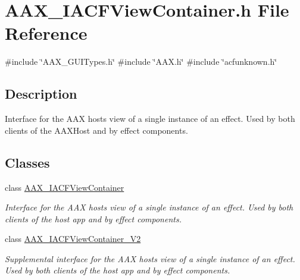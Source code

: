 \hypertarget{a00560}{}\section{A\+A\+X\+\_\+\+I\+A\+C\+F\+View\+Container.\+h File Reference}
\label{a00560}
{\ttfamily \#include \char`\"{}A\+A\+X\+\_\+\+G\+U\+I\+Types.\+h\char`\"{}}\newline
{\ttfamily \#include \char`\"{}A\+A\+X.\+h\char`\"{}}\newline
{\ttfamily \#include \char`\"{}acfunknown.\+h\char`\"{}}\newline


\subsection{Description}
Interface for the A\+AX host\textquotesingle{}s view of a single instance of an effect. Used by both clients of the A\+A\+X\+Host and by effect components. 

\subsection*{Classes}
\begin{DoxyCompactItemize}
\item 
class \mbox{\hyperlink{a01765}{A\+A\+X\+\_\+\+I\+A\+C\+F\+View\+Container}}
\begin{DoxyCompactList}\small\item\em Interface for the A\+AX host\textquotesingle{}s view of a single instance of an effect. Used by both clients of the host app and by effect components. \end{DoxyCompactList}\item 
class \mbox{\hyperlink{a01769}{A\+A\+X\+\_\+\+I\+A\+C\+F\+View\+Container\+\_\+\+V2}}
\begin{DoxyCompactList}\small\item\em Supplemental interface for the A\+AX host\textquotesingle{}s view of a single instance of an effect. Used by both clients of the host app and by effect components. \end{DoxyCompactList}\end{DoxyCompactItemize}

